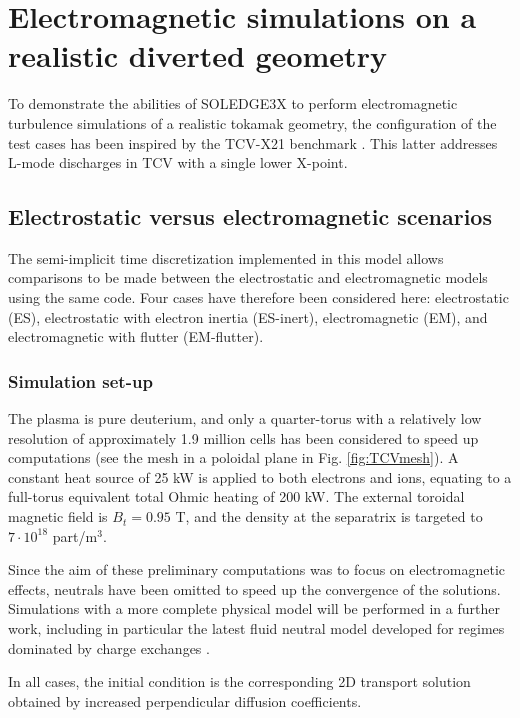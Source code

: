 \chapter{Electromagnetic simulations on a realistic diverted geometry}

To demonstrate the abilities of SOLEDGE3X to perform electromagnetic turbulence simulations of a realistic tokamak geometry, the configuration of the test cases has been inspired by the TCV-X21 benchmark \cite{oliveira2022}. This latter addresses L-mode discharges in TCV with a single lower X-point. 


\section{Electrostatic versus electromagnetic scenarios}

The semi-implicit time discretization implemented in this model allows comparisons to be made between the electrostatic and electromagnetic models using the same code. Four cases have therefore been considered here: electrostatic (ES), electrostatic with electron inertia (ES-inert), electromagnetic (EM), and electromagnetic with flutter (EM-flutter).

\subsection{Simulation set-up}

The plasma is pure deuterium, and only a quarter-torus with a relatively low resolution of approximately 1.9 million cells has been considered to speed up computations (see the mesh in a poloidal plane in Fig. \ref{fig:TCVmesh}). A constant heat source of 25 kW is applied to both electrons and ions, equating to a full-torus equivalent total Ohmic heating of 200 kW. The external toroidal magnetic field is $B_t = 0.95$ T, and the density at the separatrix is targeted to $7 \cdot 10^{18}$ part/m$^3$. \newline

Since the aim of these preliminary computations was to focus on electromagnetic effects, neutrals have been omitted to speed up the convergence of the solutions. Simulations with a more complete physical model will be performed in a further work, including in particular the latest fluid neutral model \cite{quadri2024} developed for regimes dominated by charge exchanges \cite{horsten2017}. \newline

In all cases, the initial condition is the corresponding 2D transport solution obtained by increased perpendicular diffusion coefficients. \newline

